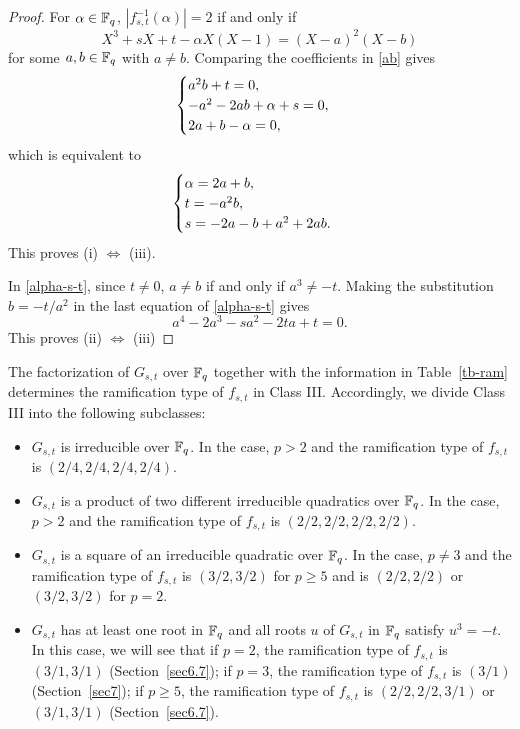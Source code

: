 \documentclass{amsart}
\numberwithin{equation}{section}
\theoremstyle{definition}
\newcommand{\f}{\Bbb F}
\begin{document}
\begin{proof}
For $\alpha\in\f_q$, $|f_{s,t}^{-1}(\alpha)|=2$ if and only if 
\begin{equation}\label{ab}
X^3+sX+t-\alpha X(X-1)=(X-a)^2(X-b)
\end{equation}
for some $a,b\in\f_q$ with $a\ne b$. Comparing the coefficients in \eqref{ab} gives
\[
\begin{cases}
a^2b+t=0,\cr
-a^2-2ab+\alpha+s=0,\cr
2a+b-\alpha=0,
\end{cases}
\]
which is equivalent to
\begin{equation}\label{alpha-s-t}
\begin{cases}
\alpha=2a+b,\cr
t=-a^2b,\cr
s=-2a-b+a^2+2ab.
\end{cases}
\end{equation}
This proves (i) $\Leftrightarrow$ (iii).

In \eqref{alpha-s-t}, since $t\ne 0$, $a\ne b$ if and only if $a^3\ne -t$. Making the substitution $b=-t/a^2$ in the last equation of \eqref{alpha-s-t} gives
\begin{equation}\label{quartic-eq}
a^4-2a^3-sa^2-2ta+t=0.
\end{equation}
This proves (ii) $\Leftrightarrow$ (iii)
\end{proof}

The factorization of $G_{s,t}$ over $\f_q$ together with the information in Table~\ref{tb-ram} determines the ramification type of $f_{s,t}$ in Class III. Accordingly, we divide Class III into the following subclasses:

\begin{itemize}
\item[(III-a)] $G_{s,t}$ is irreducible over $\f_q$. In the case, $p>2$ and the ramification type of $f_{s,t}$ is $(2/4,2/4,2/4,2/4)$.
\medskip
\item[(III-b)] $G_{s,t}$ is a product of two different irreducible quadratics over $\f_q$. In the case, $p>2$ and the ramification type of $f_{s,t}$ is $(2/2,2/2,2/2,2/2)$.
\medskip
\item[(III-c)] $G_{s,t}$ is a square of an irreducible quadratic over $\f_q$. In the case, $p\ne 3$ and the ramification type of $f_{s,t}$ is $(3/2,3/2)$ for $p\ge 5$ and is $(2/2,2/2)$ or $(3/2,3/2)$ for $p=2$.
\medskip
\item[(III-d)] $G_{s,t}$ has at least one root in $\f_q$ and all roots $u$ of $G_{s,t}$ in $\f_q$ satisfy $u^3=-t$. In this case, we will see that if $p=2$, the ramification type of $f_{s,t}$ is $(3/1,3/1)$ (Section~\ref{sec6.7}); if $p=3$, the ramification type of $f_{s,t}$ is $(3/1)$ (Section~\ref{sec7}); if $p\ge 5$, the ramification type of $f_{s,t}$ is $(2/2,2/2,3/1)$ or $(3/1,3/1)$ (Section~\ref{sec6.7}).
\end{itemize}
\end{document}
